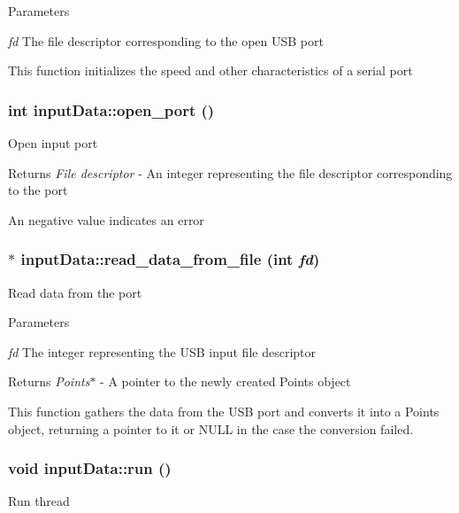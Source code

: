 \begin{DoxyParams}{Parameters}
\item[{\em fd}]The file descriptor corresponding to the open USB port\end{DoxyParams}
This function initializes the speed and other characteristics of a serial port \hypertarget{classinputData_ad3a85999bb1abee177ac0f15db28edcf}{
\subsubsection[{open\_\-port}]{\setlength{\rightskip}{0pt plus 5cm}int inputData::open\_\-port ()}}
\label{classinputData_ad3a85999bb1abee177ac0f15db28edcf}
Open input port

\begin{DoxyReturn}{Returns}
{\itshape File descriptor\/} -\/ An integer representing the file descriptor corresponding to the port
\end{DoxyReturn}
An negative value indicates an error \hypertarget{classinputData_a2d5c86a45945b8a0f93ce0a44bde4d93}{
\subsubsection[{read\_\-data\_\-from\_\-file}]{ $\ast$ inputData::read\_\-data\_\-from\_\-file (int {\em fd})}}
\label{classinputData_a2d5c86a45945b8a0f93ce0a44bde4d93}
Read data from the port


\begin{DoxyParams}{Parameters}
\item[{\em fd}]The integer representing the USB input file descriptor\end{DoxyParams}
\begin{DoxyReturn}{Returns}
{\itshape Points$\ast$\/} -\/ A pointer to the newly created Points object
\end{DoxyReturn}
This function gathers the data from the USB port and converts it into a Points object, returning a pointer to it or NULL in the case the conversion failed. \hypertarget{classinputData_a33da87cf60295dc3c661c2273d4336a1}{
\subsubsection[{run}]{\setlength{\rightskip}{0pt plus 5cm}void inputData::run ()}}
\label{classinputData_a33da87cf60295dc3c661c2273d4336a1}
Run thread

